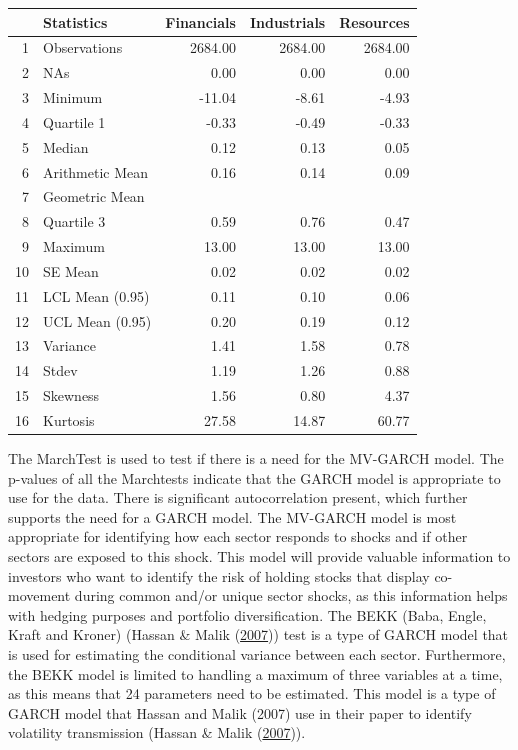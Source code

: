 \documentclass[11pt,preprint, authoryear]{elsarticle}
\let\origtable\table
\let\endorigtable\endtable
\renewenvironment{table}[1][2] {
    \expandafter\origtable\expandafter[H]
} {
    \endorigtable
}
\numberwithin{equation}{section}
\numberwithin{figure}{section}
\numberwithin{table}{section}
\begin{document}
\begin{table}[ht]
\centering
\begin{tabular}{rlrrr}
  \hline
 & Statistics & Financials & Industrials & Resources \\ 
  \hline
1 & Observations & 2684.00 & 2684.00 & 2684.00 \\ 
  2 & NAs & 0.00 & 0.00 & 0.00 \\ 
  3 & Minimum & -11.04 & -8.61 & -4.93 \\ 
  4 & Quartile 1 & -0.33 & -0.49 & -0.33 \\ 
  5 & Median & 0.12 & 0.13 & 0.05 \\ 
  6 & Arithmetic Mean & 0.16 & 0.14 & 0.09 \\ 
  7 & Geometric Mean &  &  &  \\ 
  8 & Quartile 3 & 0.59 & 0.76 & 0.47 \\ 
  9 & Maximum & 13.00 & 13.00 & 13.00 \\ 
  10 & SE Mean & 0.02 & 0.02 & 0.02 \\ 
  11 & LCL Mean (0.95) & 0.11 & 0.10 & 0.06 \\ 
  12 & UCL Mean (0.95) & 0.20 & 0.19 & 0.12 \\ 
  13 & Variance & 1.41 & 1.58 & 0.78 \\ 
  14 & Stdev & 1.19 & 1.26 & 0.88 \\ 
  15 & Skewness & 1.56 & 0.80 & 4.37 \\ 
  16 & Kurtosis & 27.58 & 14.87 & 60.77 \\ 
   \hline
\end{tabular}
\caption{Descriptive Statistics Table (restricted)} 
\label{tab1: DS}
\end{table}

The MarchTest is used to test if there is a need for the MV-GARCH model.
The p-values of all the Marchtests indicate that the GARCH model is
appropriate to use for the data. There is significant autocorrelation
present, which further supports the need for a GARCH model. The MV-GARCH
model is most appropriate for identifying how each sector responds to
shocks and if other sectors are exposed to this shock. This model will
provide valuable information to investors who want to identify the risk
of holding stocks that display co-movement during common and/or unique
sector shocks, as this information helps with hedging purposes and
portfolio diversification. The BEKK (Baba, Engle, Kraft and Kroner)
(Hassan \& Malik (\protect\hyperlink{ref-HassanSyedAun2007MGmo}{2007}))
test is a type of GARCH model that is used for estimating the
conditional variance between each sector. Furthermore, the BEKK model is
limited to handling a maximum of three variables at a time, as this
means that 24 parameters need to be estimated. This model is a type of
GARCH model that Hassan and Malik (2007) use in their paper to identify
volatility transmission (Hassan \& Malik
(\protect\hyperlink{ref-HassanSyedAun2007MGmo}{2007})).
\end{document}
